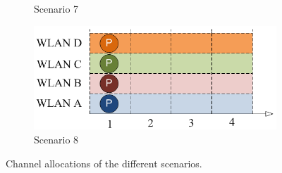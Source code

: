 \documentclass[a4paper]{article}
\begin{document}
\begin{figure}[h]
\begin{subfigure}[b]{0.475\textwidth}
    \caption[]%
    {{\small Scenario 7}}    
    \label{fig:channel_bonding_scenario7}
  \end{subfigure}
  \quad
  \begin{subfigure}[b]{0.475\textwidth}   
    \centering 
    \includegraphics[width=\textwidth]{img/channel_bonding_scenario8.png}
    \caption[]%
    {{\small Scenario 8}}    
    \label{fig:channel_bonding_scenario8}
  \end{subfigure}
\caption[Channel allocations]
{\small Channel allocations of the different scenarios.} 
\label{fig:channel_allocation_3to6}
\end{figure}
\end{document}
